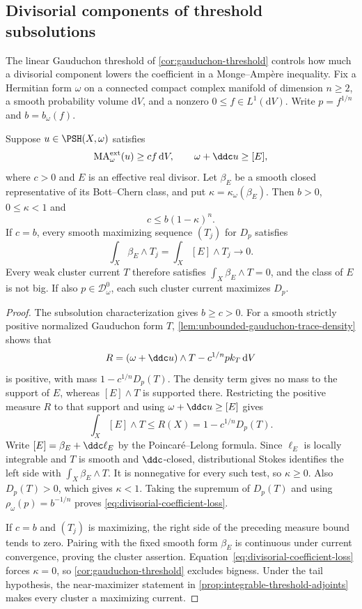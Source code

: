 \subsection{Divisorial components of threshold subsolutions}

The linear Gauduchon threshold of \cref{cor:gauduchon-threshold} controls how much a divisorial component lowers the coefficient in a Monge--Amp\`ere inequality. Fix a Hermitian form $\omega$ on a connected compact complex manifold of dimension $n\geq2$, a smooth probability volume $\mathrm{d}V$, and a nonzero $0\leq f\in L^1(\mathrm{d}V)$. Write $p=f^{1/n}$ and $b=b_\omega(f)$.

\begin{proposition}\label{prop:threshold-divisorial-constraint}
Suppose $u\in\PSH(X,\omega)$ satisfies
\[
 \mathrm{MA}^{\mathrm{ext}}_\omega(u)\geq c f\,\mathrm{d}V,
 \qquad \omega+\ddc u\geq[E],
\]
where $c>0$ and $E$ is an effective real divisor. Let $\beta_E$ be a smooth closed representative of its Bott--Chern class, and put $\kappa=\kappa_\omega(\beta_E)$. Then $b>0$, $0\leq\kappa<1$ and
\begin{equation}\label{eq:divisorial-coefficient-loss}
 c\leq b(1-\kappa)^n.
\end{equation}
If $c=b$, every smooth maximizing sequence $(T_j)$ for $D_p$ satisfies
\[
 \int_X\beta_E\wedge T_j=\int_X[E]\wedge T_j\longrightarrow0.
\]
Every weak cluster current $T$ therefore satisfies $\int_X\beta_E\wedge T=0$, and the class of $E$ is not big. If also $p\in\mathcal D_\omega^0$, each such cluster current maximizes $D_p$.
\end{proposition}
\begin{proof}
The subsolution characterization gives $b\geq c>0$. For a smooth strictly positive normalized Gauduchon form $T$, \cref{lem:unbounded-gauduchon-trace-density} shows that
\[
 R=(\omega+\ddc u)\wedge T-c^{1/n}p k_T\,\mathrm{d}V
\]
is positive, with mass $1-c^{1/n}D_p(T)$. The density term gives no mass to the support of $E$, whereas $[E]\wedge T$ is supported there. Restricting the positive measure $R$ to that support and using $\omega+\ddc u\geq[E]$ gives
\[
 \int_X[E]\wedge T\leq R(X)=1-c^{1/n}D_p(T).
\]
Write $[E]=\beta_E+\ddc\ell_E$ by the Poincar\'e--Lelong formula. Since $\ell_E$ is locally integrable and $T$ is smooth and $\ddc$-closed, distributional Stokes identifies the left side with $\int_X\beta_E\wedge T$. It is nonnegative for every such test, so $\kappa\geq0$. Also $D_p(T)>0$, which gives $\kappa<1$. Taking the supremum of $D_p(T)$ and using $\rho_\omega(p)=b^{-1/n}$ proves \eqref{eq:divisorial-coefficient-loss}.

If $c=b$ and $(T_j)$ is maximizing, the right side of the preceding measure bound tends to zero. Pairing with the fixed smooth form $\beta_E$ is continuous under current convergence, proving the cluster assertion. Equation~\eqref{eq:divisorial-coefficient-loss} forces $\kappa=0$, so \cref{cor:gauduchon-threshold} excludes bigness. Under the tail hypothesis, the near-maximizer statement in \cref{prop:integrable-threshold-adjoints} makes every cluster a maximizing current.
\end{proof}

